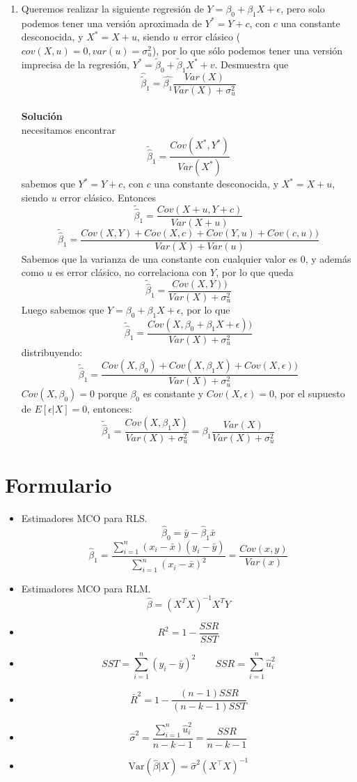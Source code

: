 \documentclass[10pt,a4paper]{article}
\begin{document}
\begin{enumerate}
\item Queremos realizar la siguiente regresión de $Y=\beta_0+\beta_1X+\epsilon$, pero solo podemos tener una versión aproximada de $Y^*=Y+c$, con $c$ una constante desconocida, y $X^*=X+u$, siendo $u$ error clásico ($cov(X,u)=0, var(u)=\sigma^2_u$), por lo que sólo podemos tener una versión imprecisa de la regresión, $Y^* = \tilde\beta_0+\tilde\beta_1X^*+v$. Desmuestra que 
$$\hat{\tilde\beta}_1=\hat{\beta_1}\frac{Var(X)}{Var(X)+\sigma^2_u}$$
\\
\textbf{Solución}
\\
necesitamos encontrar 
$$\tilde{\hat{\beta}}_1=\frac{Cov(X^*,Y^*)}{Var(X^*)}$$
sabemos que $Y^*=Y+c$, con $c$ una constante desconocida, y $X^*=X+u$, siendo $u$ error clásico. Entonces
$$\tilde{\hat{\beta}}_1=\frac{Cov(X+u,Y+c)}{Var(X+u)}$$
$$\tilde{\hat{\beta}}_1=\frac{Cov(X,Y)+Cov(X,c)+Cov(Y,u)+ Cov(c,u))}{Var(X)+Var(u)}$$
Sabemos que la varianza de una constante con cualquier valor es 0, y además como $u$ es error clásico, no correlaciona con $Y$, por lo que queda
$$\tilde{\hat{\beta}}_1=\frac{Cov(X,Y))}{Var(X)+\sigma^2_u}$$
Luego sabemos que $Y=\beta_0+\beta_1X+\epsilon$, por lo que
$$\tilde{\hat{\beta}}_1=\frac{Cov(X,\beta_0+\beta_1X+\epsilon))}{Var(X)+\sigma^2_u}$$
distribuyendo:
$$\tilde{\hat{\beta}}_1=\frac{Cov(X,\beta_0)+Cov(X,\beta_1X)+Cov(X,\epsilon))}{Var(X)+\sigma^2_u}$$
$Cov(X,\beta_0)=0$ porque $\beta_0$ es constante y $Cov(X,\epsilon)=0$, por el supuesto de $E[\epsilon|X]=0$, entonces:
$$\tilde{\hat{\beta}}_1=\frac{Cov(X,\beta_1X)}{Var(X)+\sigma^2_u}=\beta_1\frac{Var(X)}{Var(X)+\sigma^2_u}$$
\end{enumerate}

\section{Formulario}


\begin{itemize}

\item  Estimadores MCO para RLS.
{
$$\hat{\beta}_0 = \bar{y} - \hat{\beta}_1 \bar{x} $$
$$\hat{\beta}_1 = \frac{\sum_{i=1}^{n}(x_i - \bar{x})(y_i-\bar{y})}{\sum_{i=1}^{n}(x_i - \bar{x})^2}=\frac{Cov(x,y)}{Var(x)}$$}


\item  Estimadores MCO para RLM.
{
$${\hat{\beta}} = (X^TX)^{-1} X^TY $$}


    \item \[ R^2  = 1 - \frac{SSR}{SST} \] 
\item  $$SST = \sum_{i=1}^{n} (y_i - \bar{y})^2 \quad \quad SSR = \sum_{i=1}^{n}  \hat{u}_i^2 $$
    \item \[ \bar{R}^2 =  1 - \frac{(n-1)SSR}{(n-k-1)SST} \]

    \item  $$\hat{\sigma}^2 = \frac{\sum_{i=1}^{n} \hat{u}_i^2 }{n-k-1}= \frac{SSR}{n - k - 1}$$
    \item \[
\text{Var}(\hat{\beta}|X) = \hat{\sigma}^2(X^{\top}X)^{-1}
\]
    \end{itemize}
\end{document}
